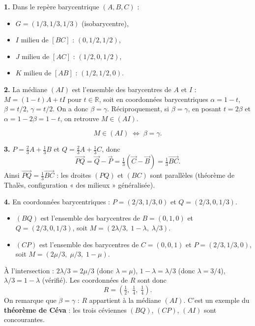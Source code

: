 \documentclass[12pt,a4paper]{article}
\begin{document}
\begin{boitecorrige}
\textbf{1.} Dans le repère barycentrique $(A,B,C)$ :
\begin{itemize}[nosep]
  \item $G = (1/3, 1/3, 1/3)$ (isobarycentre),
  \item $I$ milieu de $[BC]$ : $(0, 1/2, 1/2)$,
  \item $J$ milieu de $[AC]$ : $(1/2, 0, 1/2)$,
  \item $K$ milieu de $[AB]$ : $(1/2, 1/2, 0)$.
\end{itemize}

\textbf{2.} La médiane $(AI)$ est l'ensemble des barycentres de $A$ et $I$ : $M = (1-t)A + tI$ pour $t\in\mathbb{R}$, soit en coordonnées barycentriques $\alpha = 1-t$, $\beta = t/2$, $\gamma = t/2$. On a donc $\beta = \gamma$. Réciproquement, si $\beta = \gamma$, en posant $t = 2\beta$ et $\alpha = 1 - 2\beta = 1-t$, on retrouve $M\in(AI)$.

\[
\boxed{M\in(AI) \;\Longleftrightarrow\; \beta = \gamma.}
\]

\textbf{3.} $P = \tfrac{2}{3}A + \tfrac{1}{3}B$ et $Q = \tfrac{2}{3}A + \tfrac{1}{3}C$, donc
\[
\overrightarrow{PQ} = \overrightarrow{Q} - \overrightarrow{P} = \tfrac{1}{3}(\overrightarrow{C} - \overrightarrow{B}) = \tfrac{1}{3}\overrightarrow{BC}.
\]
Ainsi $\overrightarrow{PQ} = \tfrac{1}{3}\overrightarrow{BC}$ : les droites $(PQ)$ et $(BC)$ sont parallèles (théorème de Thalès, configuration « des milieux » généralisée).

\textbf{4.} En coordonnées barycentriques : $P = (2/3, 1/3, 0)$ et $Q = (2/3, 0, 1/3)$.
\begin{itemize}[nosep]
  \item $(BQ)$ est l'ensemble des barycentres de $B = (0,1,0)$ et $Q = (2/3, 0, 1/3)$, soit $M = (2\lambda/3,\; 1-\lambda,\; \lambda/3)$.
  \item $(CP)$ est l'ensemble des barycentres de $C = (0,0,1)$ et $P = (2/3, 1/3, 0)$, soit $M = (2\mu/3,\; \mu/3,\; 1-\mu)$.
\end{itemize}
À l'intersection : $2\lambda/3 = 2\mu/3$ (donc $\lambda = \mu$), $1-\lambda = \lambda/3$ (donc $\lambda = 3/4$), $\lambda/3 = 1-\lambda$ (vérifié). Les coordonnées de $R$ sont donc
\[
R = \left(\tfrac{1}{2},\; \tfrac{1}{4},\; \tfrac{1}{4}\right).
\]
On remarque que $\beta = \gamma$ : $R$ appartient à la médiane $(AI)$. C'est un exemple du \textbf{théorème de Céva} : les trois céviennes $(BQ)$, $(CP)$, $(AI)$ sont concourantes.

\end{boitecorrige}

\ifdefined\inMainDoc\else
\end{document}

